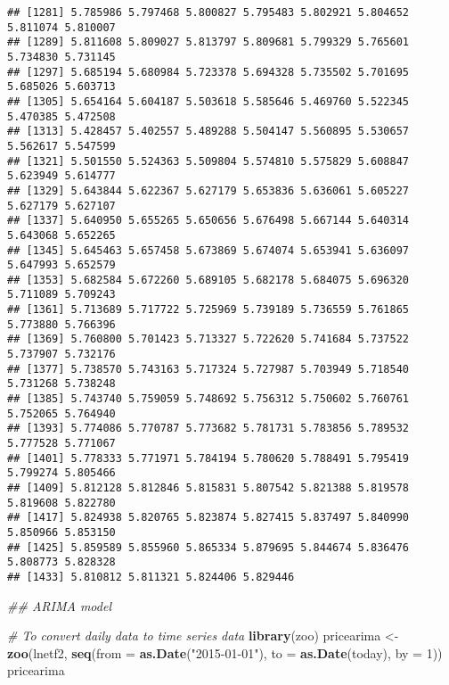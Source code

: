 \documentclass[
]{article}
\newenvironment{Shaded}{\begin{snugshade}}{\end{snugshade}}
\newcommand{\CommentTok}[1]{\textcolor[rgb]{0.56,0.35,0.01}{\textit{#1}}}
\newcommand{\DataTypeTok}[1]{\textcolor[rgb]{0.13,0.29,0.53}{#1}}
\newcommand{\DecValTok}[1]{\textcolor[rgb]{0.00,0.00,0.81}{#1}}
\newcommand{\KeywordTok}[1]{\textcolor[rgb]{0.13,0.29,0.53}{\textbf{#1}}}
\newcommand{\NormalTok}[1]{#1}
\newcommand{\StringTok}[1]{\textcolor[rgb]{0.31,0.60,0.02}{#1}}
\begin{document}
\begin{verbatim}
## [1281] 5.785986 5.797468 5.800827 5.795483 5.802921 5.804652 5.811074 5.810007
## [1289] 5.811608 5.809027 5.813797 5.809681 5.799329 5.765601 5.734830 5.731145
## [1297] 5.685194 5.680984 5.723378 5.694328 5.735502 5.701695 5.685026 5.603713
## [1305] 5.654164 5.604187 5.503618 5.585646 5.469760 5.522345 5.470385 5.472508
## [1313] 5.428457 5.402557 5.489288 5.504147 5.560895 5.530657 5.562617 5.547599
## [1321] 5.501550 5.524363 5.509804 5.574810 5.575829 5.608847 5.623949 5.614777
## [1329] 5.643844 5.622367 5.627179 5.653836 5.636061 5.605227 5.627179 5.627107
## [1337] 5.640950 5.655265 5.650656 5.676498 5.667144 5.640314 5.643068 5.652265
## [1345] 5.645463 5.657458 5.673869 5.674074 5.653941 5.636097 5.647993 5.652579
## [1353] 5.682584 5.672260 5.689105 5.682178 5.684075 5.696320 5.711089 5.709243
## [1361] 5.713689 5.717722 5.725969 5.739189 5.736559 5.761865 5.773880 5.766396
## [1369] 5.760800 5.701423 5.713327 5.722620 5.741684 5.737522 5.737907 5.732176
## [1377] 5.738570 5.743163 5.717324 5.727987 5.703949 5.718540 5.731268 5.738248
## [1385] 5.743740 5.759059 5.748692 5.756312 5.750602 5.760761 5.752065 5.764940
## [1393] 5.774086 5.770787 5.773682 5.781731 5.783856 5.789532 5.777528 5.771067
## [1401] 5.778333 5.771971 5.784194 5.780620 5.788491 5.795419 5.799274 5.805466
## [1409] 5.812128 5.812846 5.815831 5.807542 5.821388 5.819578 5.819608 5.822780
## [1417] 5.824938 5.820765 5.823874 5.827415 5.837497 5.840990 5.850966 5.853150
## [1425] 5.859589 5.855960 5.865334 5.879695 5.844674 5.836476 5.808773 5.828328
## [1433] 5.810812 5.811321 5.824406 5.829446
\end{verbatim}

\begin{Shaded}
\begin{Highlighting}[]
    \CommentTok{## ARIMA model}
    
      \CommentTok{# To convert daily data to time series data}
        \KeywordTok{library}\NormalTok{(zoo)}
\NormalTok{        pricearima <-}\StringTok{ }\KeywordTok{zoo}\NormalTok{(lnetf2, }\KeywordTok{seq}\NormalTok{(}\DataTypeTok{from =} \KeywordTok{as.Date}\NormalTok{(}\StringTok{"2015-01-01"}\NormalTok{), }\DataTypeTok{to =} \KeywordTok{as.Date}\NormalTok{(today), }\DataTypeTok{by =} \DecValTok{1}\NormalTok{))}
\NormalTok{        pricearima}
\end{Highlighting}
\end{Shaded}
\end{document}
